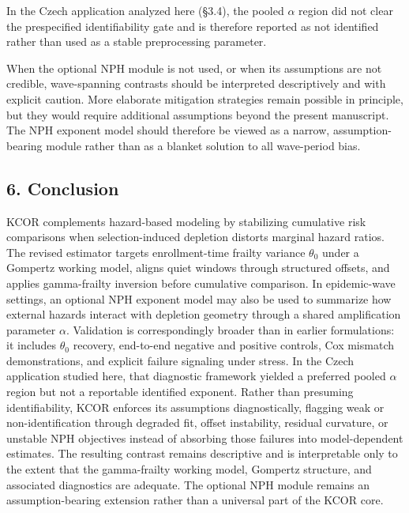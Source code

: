 \documentclass[
]{article}
\begin{document}
In the Czech application analyzed here (§3.4), the pooled \(\alpha\)
region did not clear the prespecified identifiability gate and is
therefore reported as not identified rather than used as a stable
preprocessing parameter.

When the optional NPH module is not used, or when its assumptions are
not credible, wave-spanning contrasts should be interpreted
descriptively and with explicit caution. More elaborate mitigation
strategies remain possible in principle, but they would require
additional assumptions beyond the present manuscript. The NPH exponent
model should therefore be viewed as a narrow, assumption-bearing module
rather than as a blanket solution to all wave-period bias.

\subsection{6. Conclusion}\label{conclusion}

KCOR complements hazard-based modeling by stabilizing cumulative risk
comparisons when selection-induced depletion distorts marginal hazard
ratios. The revised estimator targets enrollment-time frailty variance
\(\theta_0\) under a Gompertz working model, aligns quiet windows
through structured offsets, and applies gamma-frailty inversion before
cumulative comparison. In epidemic-wave settings, an optional NPH
exponent model may also be used to summarize how external hazards
interact with depletion geometry through a shared amplification
parameter \(\alpha\). Validation is correspondingly broader than in
earlier formulations: it includes \(\theta_0\) recovery, end-to-end
negative and positive controls, Cox mismatch demonstrations, and
explicit failure signaling under stress. In the Czech application
studied here, that diagnostic framework yielded a preferred pooled
\(\alpha\) region but not a reportable identified exponent. Rather than
presuming identifiability, KCOR enforces its assumptions diagnostically,
flagging weak or non-identification through degraded fit, offset
instability, residual curvature, or unstable NPH objectives instead of
absorbing those failures into model-dependent estimates. The resulting
contrast remains descriptive and is interpretable only to the extent
that the gamma-frailty working model, Gompertz structure, and associated
diagnostics are adequate. The optional NPH module remains an
assumption-bearing extension rather than a universal part of the KCOR
core.

\newpage
\end{document}
